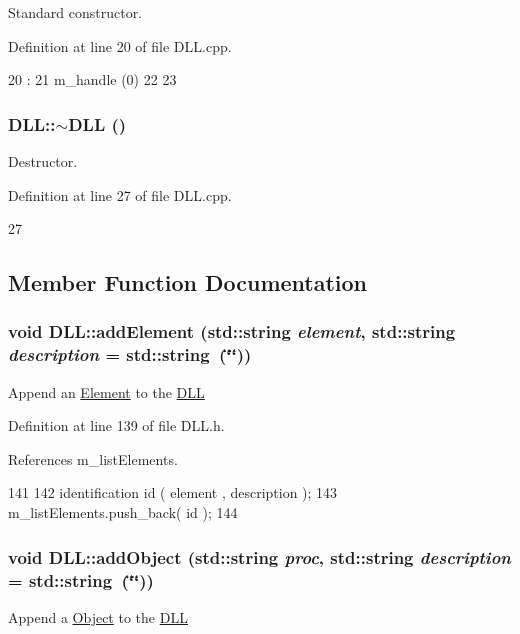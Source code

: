 Standard constructor. 

Definition at line 20 of file DLL.cpp.


\begin{DoxyCode}
20           :
21 m_handle (0)
22 {
23 }
\end{DoxyCode}
\hypertarget{classDLL_aff5b45d4b57b97144d4b49bc05aa0ddd}{
\subsubsection[{$\sim$DLL}]{\setlength{\rightskip}{0pt plus 5cm}DLL::$\sim$DLL ()}}
\label{classDLL_aff5b45d4b57b97144d4b49bc05aa0ddd}


Destructor. 

Definition at line 27 of file DLL.cpp.


\begin{DoxyCode}
27 {}
\end{DoxyCode}


\subsection{Member Function Documentation}
\hypertarget{classDLL_ac6528d0e965139d0830868fe8cace775}{
\subsubsection[{addElement}]{\setlength{\rightskip}{0pt plus 5cm}void DLL::addElement (std::string {\em element}, \/  std::string {\em description} = {\ttfamily std::string~(\char`\"{}\char`\"{})})}}
\label{classDLL_ac6528d0e965139d0830868fe8cace775}
Append an \hyperlink{classElement}{Element} to the \hyperlink{classDLL}{DLL} 

Definition at line 139 of file DLL.h.

References m\_\-listElements.


\begin{DoxyCode}
141   {
142     identification id ( element , description );
143     m_listElements.push_back( id );
144   }
\end{DoxyCode}
\hypertarget{classDLL_a76bd3e49e5e0046b017aa18afdc55a41}{
\subsubsection[{addObject}]{\setlength{\rightskip}{0pt plus 5cm}void DLL::addObject (std::string {\em proc}, \/  std::string {\em description} = {\ttfamily std::string~(\char`\"{}\char`\"{})})}}
\label{classDLL_a76bd3e49e5e0046b017aa18afdc55a41}
Append a \hyperlink{classObject}{Object} to the \hyperlink{classDLL}{DLL} 

